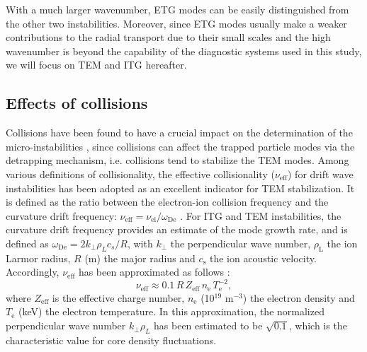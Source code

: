 With a much larger wavenumber, ETG modes can be easily distinguished from the other two instabilities. Moreover, since ETG modes usually make a weaker contributions to the radial transport due to their small scales \cite{Garbet_2001_PPCF} and the high wavenumber is beyond the capability of the diagnostic systems used in this study, we will focus on TEM and ITG hereafter.




\subsection{Effects of collisions} \label{sec:effect_collision}


Collisions have been found to have a crucial impact on the determination of the micro-instabilities \cite{Vermare_PoP_2011_collisionality_TEM}, since collisions can affect the trapped particle modes via the detrapping mechanism, i.e. collisions tend to stabilize the TEM modes. Among various definitions of collisionality, the effective collisionality ($\nu_\mathrm{eff}$) for drift wave instabilities has been adopted as an excellent indicator for TEM stabilization. It is defined as the ratio between the electron-ion collision frequency and the curvature drift frequency: $\nu_\mathrm{eff} = \nu_\mathrm{ei}/\omega_\mathrm{De}$ \cite{Angioni_2003_PoP,Garbet_ITGTEM_2004_PPCF_EPS}. For ITG and TEM instabilities, the curvature drift frequency provides an estimate of the mode growth rate, and is defined as $\omega_\mathrm{De} = 2 k_{\perp}\rho_Lc_s/R$, with $k_\perp$ the perpendicular wave number, $\rho_\mathrm{L}$ the ion Larmor radius, $R$ (m) the major radius and $c_\mathrm{s}$ the ion acoustic velocity.  Accordingly, $\nu_\mathrm{eff}$ has been approximated as follows \cite{Angioni_2003_PoP,Conway_2006_NF}:%
\begin{equation}\label{eq:nu_eff}
  \nu_\mathrm{eff} \approx 0.1\,R\,Z_\mathrm{eff}\,n_\mathrm{e}\,T_\mathrm{e}^{-2},
\end{equation}
\noindent where $Z_\mathrm{eff}$ is the effective charge number, $n_\mathrm{e}$ (10$^{19}$ m$^{-3}$) the electron density and $T_\mathrm{e}$ (keV) the electron temperature. In this approximation, the normalized perpendicular wave number $k_{\perp}\rho_L$ has been estimated to be $\sqrt{0.1}$, which is the characteristic value for core density fluctuations.


